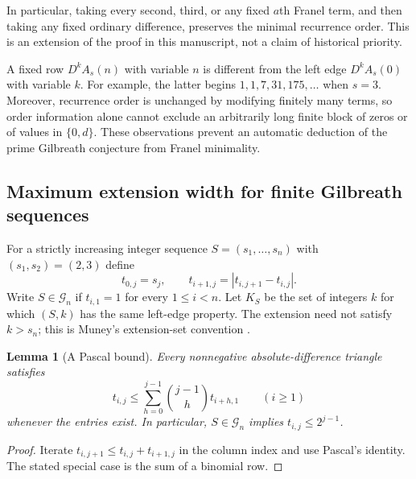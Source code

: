 \documentclass[11pt,a4paper]{article}
\newtheorem{lemma}[theorem]{Lemma}
\theoremstyle{definition}
\theoremstyle{remark}
\numberwithin{equation}{section}
\begin{document}
In particular, taking every second, third, or any fixed $a$th Franel
term, and then taking any fixed ordinary difference, preserves the
minimal recurrence order. This is an extension of the proof in this
manuscript, not a claim of historical priority.

A fixed row $D^kA_s(n)$ with variable $n$ is different from the left
edge $D^kA_s(0)$ with variable $k$. For example, the latter begins
$1,1,7,31,175,\ldots$ when $s=3$. Moreover, recurrence order is
unchanged by modifying finitely many terms, so order information alone
cannot exclude an arbitrarily long finite block of zeros or of values
in $\{0,d\}$. These observations prevent an automatic deduction of
the prime Gilbreath conjecture from Franel minimality.

\subsection{Maximum extension width for finite Gilbreath sequences}
For a strictly increasing integer sequence $S=(s_1,\ldots,s_n)$ with
$(s_1,s_2)=(2,3)$ define
\[
 t_{0,j}=s_j,\qquad t_{i+1,j}=|t_{i,j+1}-t_{i,j}|.
\]
Write $S\in\mathcal G_n$ if $t_{i,1}=1$ for every $1\le i<n$.
Let $K_S$ be the set of integers $k$ for which $(S,k)$ has the same
left-edge property. The extension need not satisfy $k>s_n$; this is
Muney's extension-set convention \cite{R003}.

\begin{lemma}[A Pascal bound]
Every nonnegative absolute-difference triangle satisfies
\[
 t_{i,j}\le\sum_{h=0}^{j-1}\binom{j-1}{h}t_{i+h,1}
 \qquad(i\ge1)
\]
whenever the entries exist. In particular, $S\in\mathcal G_n$ implies
$t_{i,j}\le2^{j-1}$.
\end{lemma}
\begin{proof}
Iterate $t_{i,j+1}\le t_{i,j}+t_{i+1,j}$ in the column index and use
Pascal's identity. The stated special case is the sum of a binomial row.
\end{proof}
\end{document}
